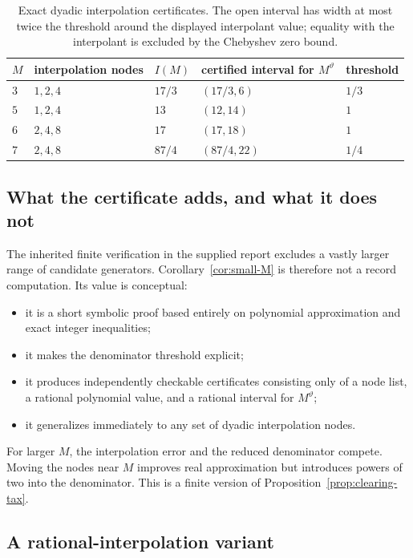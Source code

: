 \documentclass[11pt,oneside]{article}
\theoremstyle{definition}
\theoremstyle{remark}
\newcommand{\thetaq}{\vartheta}
\begin{document}
\begin{table}[ht]
\centering
\small
\begin{tabular}{lllll}
\toprule
$M$ & interpolation nodes & $I(M)$ & certified interval for $M^{\thetaq}$ & threshold \\
\midrule
$3$ & $1,2,4$ & $17/3$ & $(17/3,6)$ & $1/3$ \\
$5$ & $1,2,4$ & $13$ & $(12,14)$ & $1$ \\
$6$ & $2,4,8$ & $17$ & $(17,18)$ & $1$ \\
$7$ & $2,4,8$ & $87/4$ & $(87/4,22)$ & $1/4$ \\
\bottomrule
\end{tabular}
\caption{Exact dyadic interpolation certificates.  The open interval has width at most twice
the threshold around the displayed interpolant value; equality with the interpolant is
excluded by the Chebyshev zero bound.}
\label{tab:small-certificates}
\end{table}

\subsection{What the certificate adds, and what it does not}

The inherited finite verification in the supplied report excludes a vastly larger range of
candidate generators.  Corollary~\ref{cor:small-M} is therefore not a record computation.
Its value is conceptual:

\begin{itemize}
\item it is a short symbolic proof based entirely on polynomial approximation and exact
      integer inequalities;
\item it makes the denominator threshold explicit;
\item it produces independently checkable certificates consisting only of a node list, a
      rational polynomial value, and a rational interval for $M^{\thetaq}$;
\item it generalizes immediately to any set of dyadic interpolation nodes.
\end{itemize}

For larger $M$, the interpolation error and the reduced denominator compete.  Moving the
nodes near $M$ improves real approximation but introduces powers of two into the denominator.
This is a finite version of Proposition~\ref{prop:clearing-tax}.

\subsection{A rational-interpolation variant}
\end{document}
